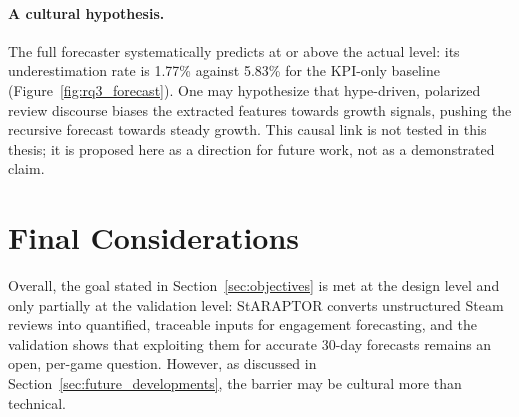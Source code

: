 \paragraph{A cultural hypothesis.} The full forecaster systematically predicts at or above the actual level: its underestimation rate is 1.77\% against 5.83\% for the KPI-only baseline (Figure~\ref{fig:rq3_forecast}). One may hypothesize that hype-driven, polarized review discourse biases the extracted features towards growth signals, pushing the recursive forecast towards steady growth. This causal link is not tested in this thesis; it is proposed here as a direction for future work, not as a demonstrated claim.

\section{Final Considerations}
\label{sec:final_considerations}
\noindent Overall, the goal stated in Section~\ref{sec:objectives} is met at the design level and only partially at the validation level: StARAPTOR converts unstructured Steam reviews into quantified, traceable inputs for engagement forecasting, and the validation shows that exploiting them for accurate 30-day forecasts remains an open, per-game question. However, as discussed in Section~\ref{sec:future_developments}, the barrier may be cultural more than technical.